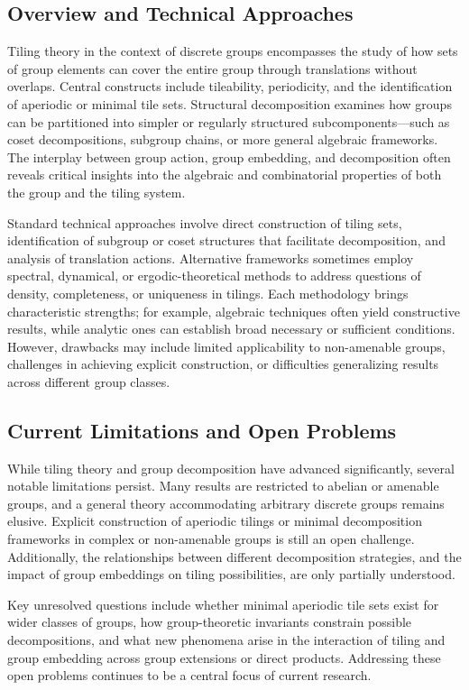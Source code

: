 \documentclass[sigconf]{acmart}
\begin{document}
\subsection*{Overview and Technical Approaches}

Tiling theory in the context of discrete groups encompasses the study of how sets of group elements can cover the entire group through translations without overlaps. Central constructs include tileability, periodicity, and the identification of aperiodic or minimal tile sets. Structural decomposition examines how groups can be partitioned into simpler or regularly structured subcomponents—such as coset decompositions, subgroup chains, or more general algebraic frameworks. The interplay between group action, group embedding, and decomposition often reveals critical insights into the algebraic and combinatorial properties of both the group and the tiling system.

Standard technical approaches involve direct construction of tiling sets, identification of subgroup or coset structures that facilitate decomposition, and analysis of translation actions. Alternative frameworks sometimes employ spectral, dynamical, or ergodic-theoretical methods to address questions of density, completeness, or uniqueness in tilings. Each methodology brings characteristic strengths; for example, algebraic techniques often yield constructive results, while analytic ones can establish broad necessary or sufficient conditions. However, drawbacks may include limited applicability to non-amenable groups, challenges in achieving explicit construction, or difficulties generalizing results across different group classes.

\subsection*{Current Limitations and Open Problems}

While tiling theory and group decomposition have advanced significantly, several notable limitations persist. Many results are restricted to abelian or amenable groups, and a general theory accommodating arbitrary discrete groups remains elusive. Explicit construction of aperiodic tilings or minimal decomposition frameworks in complex or non-amenable groups is still an open challenge. Additionally, the relationships between different decomposition strategies, and the impact of group embeddings on tiling possibilities, are only partially understood.

Key unresolved questions include whether minimal aperiodic tile sets exist for wider classes of groups, how group-theoretic invariants constrain possible decompositions, and what new phenomena arise in the interaction of tiling and group embedding across group extensions or direct products. Addressing these open problems continues to be a central focus of current research.
\end{document}
